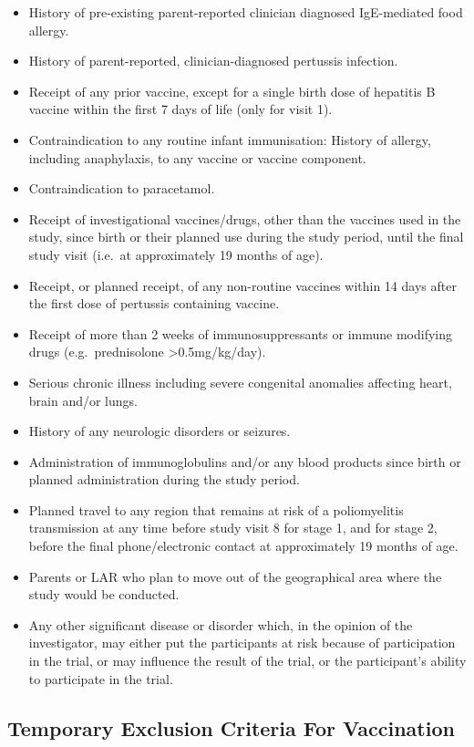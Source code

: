 \documentclass{bmcart}
\begin{document}
\begin{itemize}
	\item History of pre-existing parent-reported clinician diagnosed IgE-mediated food allergy.
	\item History of parent-reported, clinician-diagnosed pertussis infection.
	\item Receipt of any prior vaccine, except for a single birth dose of hepatitis B vaccine within the first 7 days of life (only for visit 1).
	\item Contraindication to any routine infant immunisation: History of allergy, including anaphylaxis, to any vaccine or vaccine component.
	\item Contraindication to paracetamol.
	\item Receipt of investigational vaccines/drugs, other than the vaccines used in the study, since birth or their planned use during the study period, until the final study visit (i.e.~at approximately 19 months of age).
	\item Receipt, or planned receipt, of any non-routine vaccines within 14 days after the first dose of pertussis containing vaccine.
	\item Receipt of more than 2 weeks of immunosuppressants or immune modifying drugs (e.g.~prednisolone \textgreater0.5mg/kg/day).
	\item Serious chronic illness including severe congenital anomalies affecting heart, brain and/or lungs.
	\item History of any neurologic disorders or seizures.
	\item Administration of immunoglobulins and/or any blood products since birth or planned administration during the study period.
	\item Planned travel to any region that remains at risk of a poliomyelitis transmission at any time before study visit 8 for stage 1, and for stage 2, before the final phone/electronic contact at approximately 19 months of age.
	\item Parents or LAR who plan to move out of the geographical area where the study would be conducted.
	\item Any other significant disease or disorder which, in the opinion of the investigator, may either put the participants at risk because of participation in the trial, or may influence the result of the trial, or the participant's ability to participate in the trial.
\end{itemize}

\subsection*{Temporary Exclusion Criteria For Vaccination}
\end{document}
